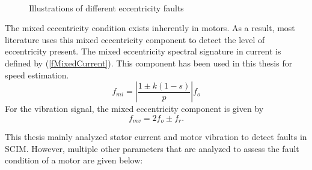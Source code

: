 %
\begin{figure}[h]
	\centering \mbox{
		}
	\caption{Illustrations of different eccentricity faults}
	\label{Fig:introEcc}
\end{figure}
The mixed eccentricity condition exists inherently in motors. As a result, most literature uses this mixed eccentricity component to detect the level of eccentricity present. The mixed eccentricity spectral signature in current is defined by (\ref{fMixedCurrent}). This component has been used in this thesis for speed estimation.
\begin{equation}
	\label{fMixedCurrent}
	{f_{mi}} = \left| {\frac{{1 \pm k(1 - s)}}{p}} \right|{f_o}
\end{equation}
For the vibration signal, the mixed eccentricity component is given by \cite{Nandi2005}
\begin{equation}
	\label{mixedEccVibration}
	{f_{mv}} = 2f_o \pm f_r.
\end{equation}

This thesis mainly analyzed stator current and motor vibration to detect faults in SCIM. However, multiple other parameters that are analyzed to assess the fault condition of a motor are given below: 
